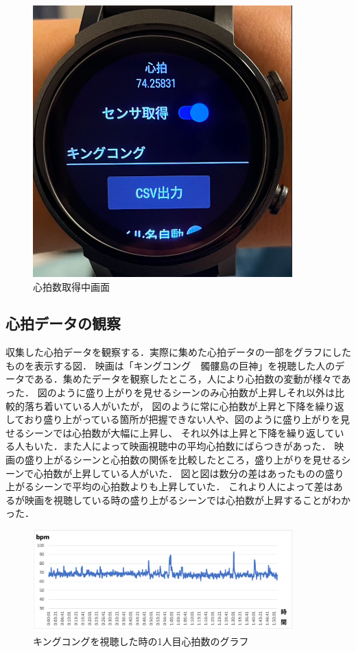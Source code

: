 \begin{figure}[H]
    \centering
    \includegraphics[width=10cm]{images/chapter3/csv.png}
    \caption{心拍数取得中画面}
\end{figure}

\subsection{心拍データの観察}

収集した心拍データを観察する．実際に集めた心拍データの一部をグラフにしたものを表示する図．
映画は「キングコング　髑髏島の巨神」を視聴した人のデータである．集めたデータを観察したところ，人により心拍数の変動が様々であった．
図のように盛り上がりを見せるシーンのみ心拍数が上昇しそれ以外は比較的落ち着いている人がいたが，
図のように常に心拍数が上昇と下降を繰り返しており盛り上がっている箇所が把握できない人や、図のように盛り上がりを見せるシーンでは心拍数が大幅に上昇し、
それ以外は上昇と下降を繰り返している人もいた．また人によって映画視聴中の平均心拍数にばらつきがあった．
映画の盛り上がるシーンと心拍数の関係を比較したところ，盛り上がりを見せるシーンで心拍数が上昇している人がいた．
図と図は数分の差はあったものの盛り上がるシーンで平均の心拍数よりも上昇していた．
これより人によって差はあるが映画を視聴している時の盛り上がるシーンでは心拍数が上昇することがわかった．

\begin{figure}[H]
    \centering
    \includegraphics[width=10cm]{images/chapter3/gurafu2.png}
    \caption{キングコングを視聴した時の1人目心拍数のグラフ}
\end{figure}

